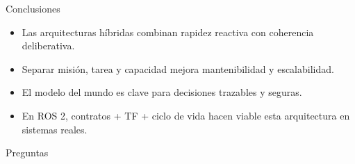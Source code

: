 \documentclass[aspectratio=169]{beamer}
\begin{document}
\begin{frame}{Conclusiones}
\small
\begin{itemize}
  \item Las arquitecturas híbridas combinan rapidez reactiva con coherencia deliberativa.
  \item Separar misión, tarea y capacidad mejora mantenibilidad y escalabilidad.
  \item El modelo del mundo es clave para decisiones trazables y seguras.
  \item En ROS 2, contratos + TF + ciclo de vida hacen viable esta arquitectura en sistemas reales.
\end{itemize}
\end{frame}

\begin{frame}
  \centering
  \Large Preguntas
\end{frame}
\end{document}
